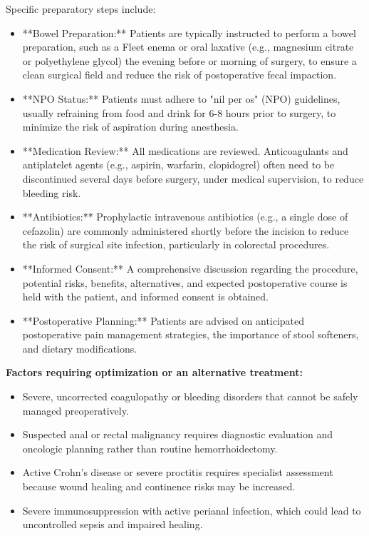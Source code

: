 Specific preparatory steps include:

\begin{itemize}
  \item **Bowel Preparation:** Patients are typically instructed to perform a bowel preparation, such as a Fleet enema or oral laxative (e.g., magnesium citrate or polyethylene glycol) the evening before or morning of surgery, to ensure a clean surgical field and reduce the risk of postoperative fecal impaction.
  
  \item **NPO Status:** Patients must adhere to "nil per os" (NPO) guidelines, usually refraining from food and drink for 6-8 hours prior to surgery, to minimize the risk of aspiration during anesthesia.
  
  \item **Medication Review:** All medications are reviewed. Anticoagulants and antiplatelet agents (e.g., aspirin, warfarin, clopidogrel) often need to be discontinued several days before surgery, under medical supervision, to reduce bleeding risk.
  
  \item **Antibiotics:** Prophylactic intravenous antibiotics (e.g., a single dose of cefazolin) are commonly administered shortly before the incision to reduce the risk of surgical site infection, particularly in colorectal procedures.
  
  \item **Informed Consent:** A comprehensive discussion regarding the procedure, potential risks, benefits, alternatives, and expected postoperative course is held with the patient, and informed consent is obtained.
  
  \item **Postoperative Planning:** Patients are advised on anticipated postoperative pain management strategies, the importance of stool softeners, and dietary modifications.
\end{itemize}

\textbf{Factors requiring optimization or an alternative treatment:}

\begin{itemize}
  \item Severe, uncorrected coagulopathy or bleeding disorders that cannot be safely managed preoperatively.
  
  \item Suspected anal or rectal malignancy requires diagnostic evaluation and oncologic planning rather than routine hemorrhoidectomy.
  
  \item Active Crohn's disease or severe proctitis requires specialist assessment because wound healing and continence risks may be increased.
  
  \item Severe immunosuppression with active perianal infection, which could lead to uncontrolled sepsis and impaired healing.
\end{itemize}

